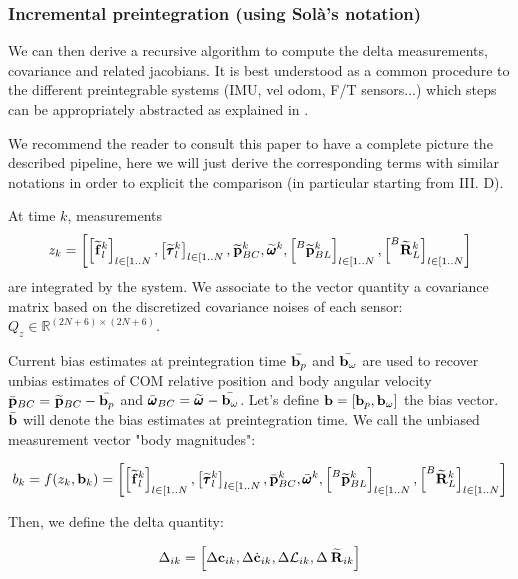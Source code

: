 \documentclass[11pt]{article}
\newcommand{\Rotm}[2]{\prescript{#1}{}{\widetilde{\bfR}}_{#2}}
\newcommand{\bias}{\bfb}
\newcommand{\posim}[2]{\prescript{#1}{}{\widetilde{\bfp}}_{#2}}
\newcommand{\posibar}{\bar{\bfp}}
\newcommand{\angvelm}[2]{\prescript{#1}{}{\widetilde{\pmb{\omega}}}_{#2}}
\newcommand{\angvelbar}{\bar{\pmb{\omega}}}
\newcommand{\forcem}[2]{\prescript{#1}{}{\widetilde{\bff}}_{#2}}
\newcommand{\torquem}[2]{\prescript{#1}{}{\widetilde{\pmb{\tau}}}_{#2}}
\newcommand{\AM}{\mathcal{L}}
\newcommand{\COM}{\bfc}
\newcommand{\COMd}{\dot{\bfc}}
\newcommand{\Reals}{\mathbb{R}}
\begin{document}
\subsubsection{Incremental preintegration (using Solà's notation)}
We can then derive a recursive algorithm to compute the delta measurements, covariance and related jacobians. It is best understood as a common procedure to the different preintegrable systems (IMU, vel odom, F/T sensors...) which steps can be appropriately abstracted as explained in \cite{atchuthan2018odometry}.  

We recommend the reader to consult this paper to have a complete picture the described pipeline, here we will just derive the corresponding terms with similar notations in order to explicit the comparison (in particular starting from III. D).

At time $k$, measurements
%
\begin{equation}
z_k = \left[ \left[\forcem{}{l}^k \right]_{l \in [1..N}, \left[\torquem{}{l}^k \right]_{l \in [1..N}, \posim{}{BC}^k, \angvelm{}{}^k, \left[\posim{B}{BL}^k \right]_{l \in [1..N}, \left[\Rotm{B}{L}^k \right]_{l \in [1..N}\right]
\end{equation}
%
are integrated by the system. We associate to the vector quantity a covariance matrix based on the discretized covariance noises of each sensor: $Q_{z} \in \Reals^{(2N+6) \times (2N+6)}$.

Current bias estimates at preintegration time $\bar{\bias_p}$ and $\bar{\bias_{\omega}}$ are used to recover unbias estimates of COM relative position and body angular velocity $\posibar_{BC} = \posim{}{BC} - \bar{\bias_p}$ and $\angvelbar_{BC} = \angvelm{}{} - \bar{\bias_{\omega}}$. Let's define $\bias = \left[\bias_p, \bias_{\omega} \right]$ the bias vector. $\bar{\bias}$ will denote the bias estimates at preintegration time. We call the unbiased measurement vector "body magnitudes":

\begin{equation}
    b_k = f(z_k, \bias_k) = \left[ \left[\forcem{}{l}^k \right]_{l \in [1..N}, \left[\torquem{}{l}^k \right]_{l \in [1..N}, \posibar_{BC}^k, \angvelbar{}{}^k, \left[\posim{B}{BL}^k \right]_{l \in [1..N}, \left[\Rotm{B}{L}^k \right]_{l \in [1..N}\right]
\end{equation}

Then, we define the delta quantity:

\begin{equation}
    \Delta_{ik} = \left[ \Delta \COM_{ik}, \Delta \COMd_{ik}, \Delta \AM_{ik}, \Delta \Rotm{}{ik} \right]
\end{equation}
\end{document}
